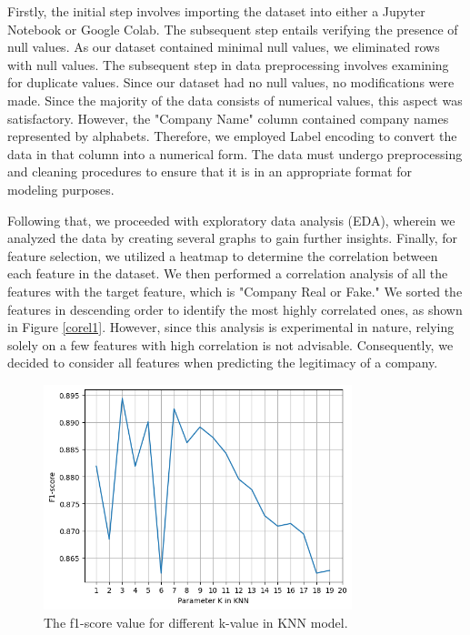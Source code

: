 \documentclass{article}
\begin{document}
Firstly, the initial step involves importing the dataset into either a Jupyter Notebook or Google Colab. The subsequent step entails verifying the presence of null values. As our dataset contained minimal null values, we eliminated rows with null values. The subsequent step in data preprocessing involves examining for duplicate values. Since our dataset had no null values, no modifications were made. Since the majority of the data consists of numerical values, this aspect was satisfactory. However, the "Company Name" column contained company names represented by alphabets. Therefore, we employed Label encoding to convert the data in that column into a numerical form. The data must undergo preprocessing and cleaning procedures to ensure that it is in an appropriate format for modeling purposes. 

Following that, we proceeded with exploratory data analysis (EDA), wherein we analyzed the data by creating several graphs to gain further insights. Finally, for feature selection, we utilized a heatmap to determine the correlation between each feature in the dataset. We then performed a correlation analysis of all the features with the target feature, which is "Company Real or Fake." We sorted the features in descending order to identify the most highly correlated ones, as shown in Figure \ref{corel1}. However, since this analysis is experimental in nature, relying solely on a few features with high correlation is not advisable. Consequently, we decided to consider all features when predicting the legitimacy of a company.

\begin{figure}[h] 
\centering
\includegraphics[width=0.8\textwidth]{Knn-plot.png}
\caption{The f1-score value for different k-value in KNN model.} \label{knn}
\end{figure}
\end{document}
